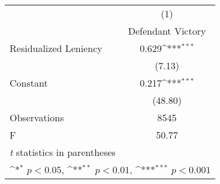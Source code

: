 {
\def\sym#1{\ifmmode^{#1}\else\(^{#1}\)\fi}
\begin{tabular}{l*{1}{c}}
\toprule
                    &\multicolumn{1}{c}{(1)}         \\
                    &Defendant Victory         \\
\midrule
Residualized Leniency&       0.629\sym{***}\\
                    &      (7.13)         \\
\addlinespace
Constant            &       0.217\sym{***}\\
                    &     (48.80)         \\
\midrule
Observations        &        8545         \\
F                   &       50.77         \\
\bottomrule
\multicolumn{2}{l}{\footnotesize \textit{t} statistics in parentheses}\\
\multicolumn{2}{l}{\footnotesize \sym{*} \(p<0.05\), \sym{**} \(p<0.01\), \sym{***} \(p<0.001\)}\\
\end{tabular}
}
